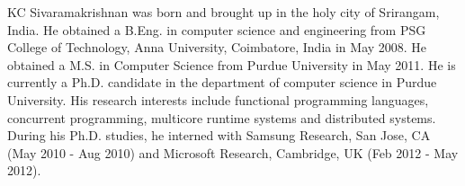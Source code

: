 \begin{vita}
KC Sivaramakrishnan was born and brought up in the holy city of Srirangam,
India. He obtained a B.Eng. in computer science and engineering from PSG
College of Technology, Anna University, Coimbatore, India in May 2008. He
obtained a M.S. in Computer Science from Purdue University in May 2011. He is
currently a Ph.D. candidate in the department of computer science in Purdue
University. His research interests include functional programming languages,
concurrent programming, multicore runtime systems and distributed systems.
During his Ph.D. studies, he interned with Samsung Research, San Jose, CA (May
2010 - Aug 2010) and Microsoft Research, Cambridge, UK (Feb 2012 - May 2012).
\end{vita}
